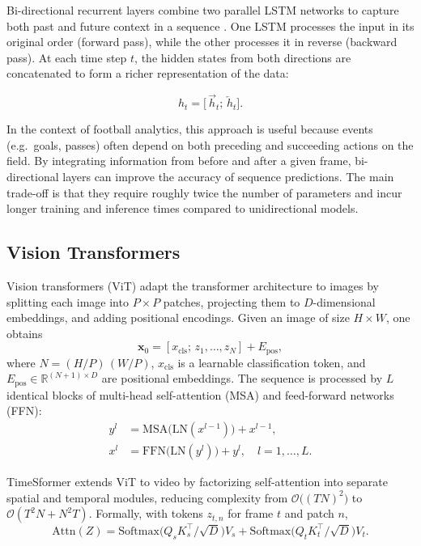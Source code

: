 Bi-directional recurrent layers combine two parallel LSTM networks to capture both past and future context in a sequence \cite{radhakrishnan_bi_lstm_2023}\cite{bhogal_human_2023}. One LSTM processes the input in its original order (forward pass), while the other processes it in reverse (backward pass). At each time step \(t\), the hidden states from both directions are concatenated to form a richer representation of the data:

\[
h_t = \bigl[\,\overrightarrow{h}_t;\,\overleftarrow{h}_t\bigr].
\]

In the context of football analytics, this approach is useful because events (e.g.\ goals, passes) often depend on both preceding and succeeding actions on the field. By integrating information from before and after a given frame, bi-directional layers can improve the accuracy of sequence predictions. The main trade-off is that they require roughly twice the number of parameters and incur longer training and inference times compared to unidirectional models.


\subsection{Vision Transformers}
\label{ssec:vision_transformers}

Vision transformers (ViT) adapt the transformer architecture \cite{vaswani_attention_2017} to images by splitting each image into $P\times P$ patches, projecting them to $D$-dimensional embeddings, and adding positional encodings. Given an image of size $H\times W$, one obtains
\[
\mathbf{x}_0 = [x_{\text{cls}};\,z_1,\dots,z_N] + E_{\text{pos}},
\]
where $N=(H/P)\,(W/P)$, $x_{\text{cls}}$ is a learnable classification token, and $E_{\text{pos}}\in\mathbb{R}^{(N+1)\times D}$ are positional embeddings. The sequence is processed by $L$ identical blocks of multi-head self-attention (MSA) and feed-forward networks (FFN):
\begin{align*}
y^l &= \mathrm{MSA}\bigl(\mathrm{LN}(x^{l-1})\bigr) + x^{l-1},\\
x^l &= \mathrm{FFN}\bigl(\mathrm{LN}(y^l)\bigr) + y^l,\quad l=1,\dots,L.
\end{align*}

TimeSformer \cite{bertasius_timesformer_2021} extends ViT to video by factorizing self-attention into separate spatial and temporal modules, reducing complexity from $\mathcal{O}\bigl((TN)^2\bigr)$ to $\mathcal{O}(T^2N + N^2T)$. Formally, with tokens $z_{t,n}$ for frame $t$ and patch $n$,
\[
\mathrm{Attn}(Z)
= \mathrm{Softmax}\!\bigl(Q_sK_s^\top/\sqrt{D}\bigr)V_s
+ \mathrm{Softmax}\!\bigl(Q_tK_t^\top/\sqrt{D}\bigr)V_t.
\]

